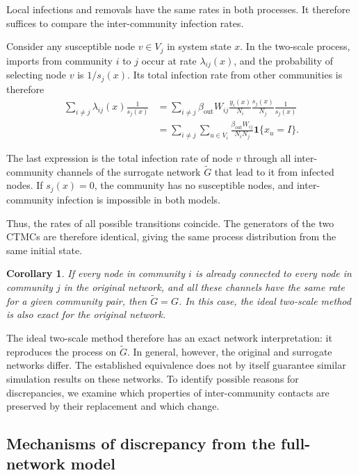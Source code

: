 \documentclass{ieeeaccess}
\newtheorem{corollary}{Corollary}
\newenvironment{proof}{\begin{IEEEproof}}{\end{IEEEproof}}
\newcommand{\ind}{\mathbf{1}}
\begin{document}
\begin{proof}
Local infections and removals have the same rates in both processes. It therefore suffices to compare the inter-community infection rates.

Consider any susceptible node $v\in V_j$ in system state $x$. In the two-scale process, imports from community $i$ to $j$ occur at rate $\lambda_{ij}(x)$, and the probability of selecting node $v$ is $1/s_j(x)$. Its total infection rate from other communities is therefore
\[
\begin{aligned}
\sum_{i\neq j}\lambda_{ij}(x)\frac{1}{s_j(x)}
&=
\sum_{i\neq j}
\beta_{\mathrm{out}}W_{ij}
\frac{y_i(x)}{N_i}
\frac{s_j(x)}{N_j}
\frac{1}{s_j(x)}
\\
&=
\sum_{i\neq j}
\sum_{u\in V_i}
\frac{\beta_{\mathrm{out}}W_{ij}}{N_iN_j}
\ind\{x_u=I\}.
\end{aligned}
\]

The last expression is the total infection rate of node $v$ through all inter-community channels of the surrogate network $\tilde G$ that lead to it from infected nodes. If $s_j(x)=0$, the community has no susceptible nodes, and inter-community infection is impossible in both models.

Thus, the rates of all possible transitions coincide. The generators of the two CTMCs are therefore identical, giving the same process distribution from the same initial state.
\end{proof}

\begin{corollary}
\label{cor:exact}
If every node in community $i$ is already connected to every node in community $j$ in the original network, and all these channels have the same rate for a given community pair, then $\tilde G=G$. In this case, the ideal two-scale method is also exact for the original network.
\end{corollary}

The ideal two-scale method therefore has an exact network interpretation: it reproduces the process on $\tilde G$. In general, however, the original and surrogate networks differ. The established equivalence does not by itself guarantee similar simulation results on these networks. To identify possible reasons for discrepancies, we examine which properties of inter-community contacts are preserved by their replacement and which change.

\subsection{Mechanisms of discrepancy from the full-network model}
\label{sec:sources}
\end{document}

